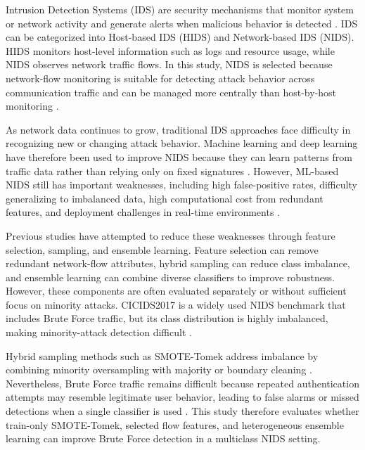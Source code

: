 \documentclass[conference,a4paper]{IEEEtran}
\begin{document}
Intrusion Detection Systems (IDS) are security mechanisms that monitor system or network activity and generate alerts when malicious behavior is detected \cite{singh2022minority}. IDS can be categorized into Host-based IDS (HIDS) and Network-based IDS (NIDS). HIDS monitors host-level information such as logs and resource usage, while NIDS observes network traffic flows. In this study, NIDS is selected because network-flow monitoring is suitable for detecting attack behavior across communication traffic and can be managed more centrally than host-by-host monitoring \cite{almuhanna2025anomaly,irfaissurur2025web}.

As network data continues to grow, traditional IDS approaches face difficulty in recognizing new or changing attack behavior. Machine learning and deep learning have therefore been used to improve NIDS because they can learn patterns from traffic data rather than relying only on fixed signatures \cite{almuhanna2025anomaly,ahmed2024explainable}. However, ML-based NIDS still has important weaknesses, including high false-positive rates, difficulty generalizing to imbalanced data, high computational cost from redundant features, and deployment challenges in real-time environments \cite{almuhanna2025anomaly,alsaffar2024shielding,alessa2024hybrid,yang2024imbalanced,prasad2025optimizing}.

Previous studies have attempted to reduce these weaknesses through feature selection, sampling, and ensemble learning. Feature selection can remove redundant network-flow attributes, hybrid sampling can reduce class imbalance, and ensemble learning can combine diverse classifiers to improve robustness. However, these components are often evaluated separately or without sufficient focus on minority attacks. CICIDS2017 is a widely used NIDS benchmark that includes Brute Force traffic, but its class distribution is highly imbalanced, making minority-attack detection difficult \cite{khan2024balanced,irfaissurur2025web,le2024unbalanced,harini2023minority}.

Hybrid sampling methods such as SMOTE-Tomek address imbalance by combining minority oversampling with majority or boundary cleaning \cite{khan2024balanced,le2024unbalanced,nassreddine2025ensemble}. Nevertheless, Brute Force traffic remains difficult because repeated authentication attempts may resemble legitimate user behavior, leading to false alarms or missed detections when a single classifier is used \cite{rihan2023iot,irfaissurur2025web}. This study therefore evaluates whether train-only SMOTE-Tomek, selected flow features, and heterogeneous ensemble learning can improve Brute Force detection in a multiclass NIDS setting.
\end{document}
